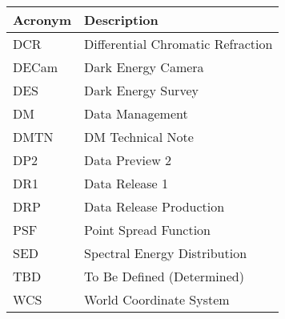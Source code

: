 \addtocounter{table}{-1}
\begin{longtable}{p{}p{}}\hline
\textbf{Acronym} & \textbf{Description}  \\\hline

DCR & Differential Chromatic Refraction \\\hline
DECam & Dark Energy Camera \\\hline
DES & Dark Energy Survey \\\hline
DM & Data Management \\\hline
DMTN & DM Technical Note \\\hline
DP2 & Data Preview 2 \\\hline
DR1 & Data Release 1 \\\hline
DRP & Data Release Production \\\hline
PSF & Point Spread Function \\\hline
SED & Spectral Energy Distribution \\\hline
TBD & To Be Defined (Determined) \\\hline
WCS & World Coordinate System \\\hline
\end{longtable}
